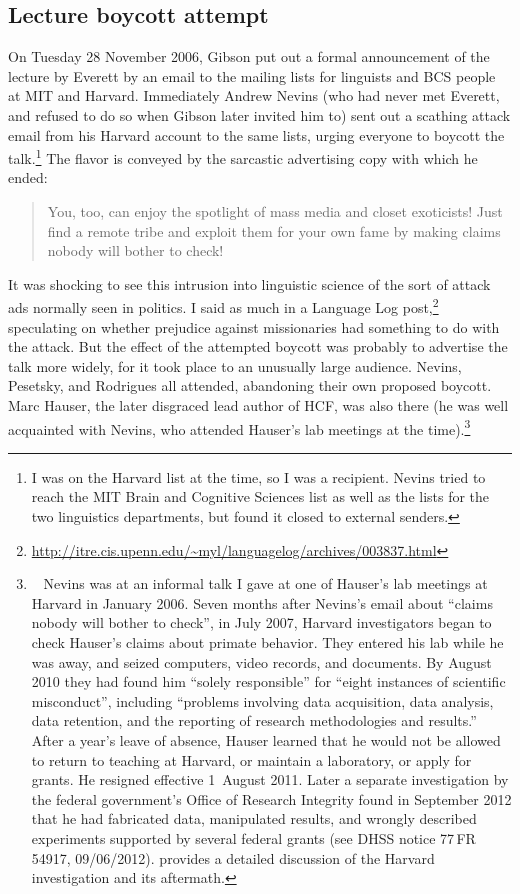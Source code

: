 \documentclass[output=paper,colorlinks,citecolor=brown
]{langscibook}
\begin{document}
\subsection{Lecture boycott attempt}

On Tuesday 28 November 2006, Gibson put out a formal announcement of
the lecture by Everett by an email to the mailing lists for linguists
and BCS people at MIT and Harvard. Immediately Andrew Nevins (who had
never met Everett, and refused to do so when Gibson later invited him to)
sent out a scathing attack email from his Harvard account to the same
lists, urging everyone to boycott the talk.\footnote{%
   I was on the Harvard list at the time, so I was a recipient. Nevins
   tried to reach the MIT Brain and Cognitive Sciences list as well as
   the lists for the two linguistics departments, but found it closed to
   external senders.}
The flavor is conveyed by the sarcastic advertising copy with which
he ended:
\begin{quote}
\textsf{You, too, can enjoy the spotlight of mass media and closet
exoticists! Just find a remote tribe and exploit them for your
own fame by making claims nobody will bother to check!}
\end{quote}

It was shocking to see this intrusion into linguistic science of the
sort of attack ads normally seen in politics. I said as much in a
Language Log post,\footnote{%
   \url{http://itre.cis.upenn.edu/~myl/languagelog/archives/003837.html}}
speculating on whether prejudice against missionaries had something to
do with the attack. But the effect of the attempted boycott was probably
to advertise the talk more widely, for it took place to an unusually
large audience. Nevins, Pesetsky, and Rodrigues all attended, abandoning
their own proposed boycott.  Marc Hauser, the later disgraced lead author
of HCF, was also there (he was well acquainted with Nevins, who attended
Hauser's lab meetings at the time).\footnote{\label{misconduct}~
   Nevins was at an informal talk I gave at one of Hauser's lab meetings
   at Harvard in January 2006. Seven months after Nevins's email about
   ``claims nobody will bother to check'', in July 2007, Harvard
   investigators began to check Hauser's claims about primate behavior.
   They entered his lab while he was away, and seized computers, video
   records, and documents. By August 2010 they had found him ``solely
   responsible'' for ``eight instances of scientific misconduct'', including
   ``problems involving data acquisition, data analysis, data retention,
   and the reporting of research methodologies and results.'' After a year's
   leave of absence, Hauser learned that he would not be allowed to return
   to teaching at Harvard, or maintain a laboratory, or apply for grants.
   He resigned effective 1~August 2011. Later a separate investigation by
   the federal government's Office of Research Integrity found in September
   2012 that he had fabricated data, manipulated results, and wrongly
   described experiments supported by several federal grants (see DHSS
   notice 77\,FR\,54917, 09/06/2012). \citet{Gross11} provides a detailed
   discussion of the Harvard investigation and its aftermath.}
\end{document}
